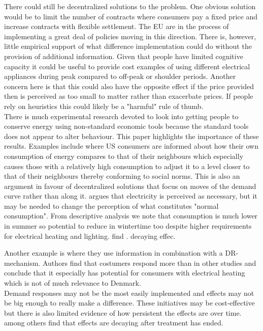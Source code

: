 There could still be decentralized solutions to the problem. One obvious solution would be to limit the number of contracts where consumers pay a fixed price and increase contracts with flexible settlement. The EU are in the process of implementing a great deal of policies moving in this direction. There is, however, little empirical support of what difference implementation could do without the provision of additional information. Given that people have limited cognitive capacity it could be useful to provide cost examples of using different electrical appliances during peak compared to off-peak or shoulder periods.
Another concern here is that this could also have the opposite effect if the price provided then is perceived as too small to matter rather than exacerbate prices. If people rely on heuristics this could likely be a "harmful" rule of thumb.
\smallskip \\

There is much experimental research devoted to look into getting people to conserve energy using non-standard economic tools because the standard tools does not appear to alter behaviour. This paper highlights the importance of these results. Examples include \cite{allcott2011social} where US consumers are informed about how their own consumption of energy compares to that of their neighbours which especially causes those with a relatively high consumption to adjust it to a level closer to that of their neighbours thereby conforming to social norms. This is also an argument in favour of decentralized solutions that focus on moves of the demand curve rather than along it. \cite{kirschen2003demand} argues that electricity is perceived as necessary, but it may be needed to change the perception of what constitutes "normal consumption". From descriptive analysis we note that consumption is much lower in summer so potential to reduce in wintertime too despite higher requirements for electrical heating and lighting.
\cite{allcott2014short} find . decaying effec.


Another example is \citep{saele2011demand} where they use information in combination with a DR-mechanism. Authors find that costumers respond more than in other studies and conclude that it especially has potential for consumers with electrical heating which is not of much relevance to Denmark.\smallskip \\

Demand responses may not be the most easily implemented and effects may not be big enough to really make a difference. These initiatives may be cost-effective but there is also limited evidence of how persistent the effects are over time. \cite{allcott2014short} among others find that effects are decaying after treatment has ended. \smallskip \\


